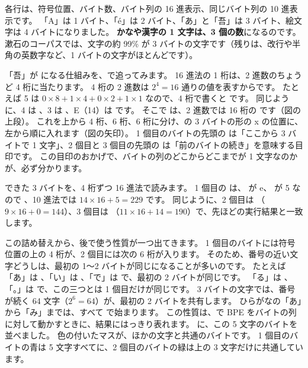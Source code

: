 
各行は、符号位置、バイト数、バイト列の 16 進表示、同じバイト列の 10 進表示です。
「A」は 1 バイト、「é」は 2 バイト、「あ」と「吾」は 3 バイト、絵文字は 4 バイトになりました。
\textbf{かなや漢字の 1 文字は、3 個の数}になるのです。
漱石のコーパスでは、文字の約 99\% が 3 バイトの文字です（残りは、改行や半角の英数字など、1 バイトの文字がほとんどです）。

「吾」が  になる仕組みを、で追ってみます。
16 進法の 1 桁は、2 進数のちょうど 4 桁に当たります。
4 桁の 2 進数は $2^4=16$ 通りの値を表すからです。
たとえば 5 は $0\times8+1\times4+0\times2+1\times1$ なので、4 桁で書くと  です。
同じように、4 は 、3 は 、E（14）は  です。
そこで  は、2 進数では 16 桁の  です（図の上段）。
これを上から 4 桁、6 桁、6 桁に分け、の 3 バイトの形の x の位置に、左から順に入れます（図の矢印）。
1 個目のバイトの先頭の  は「ここから 3 バイトで 1 文字」、2 個目と 3 個目の先頭の  は「前のバイトの続き」を意味する目印です。
この目印のおかげで、バイトの列のどこからどこまでが 1 文字なのかが、必ず分かります。

できた 3 バイトを、4 桁ずつ 16 進法で読みます。
1 個目の  は、 が e、 が 5 なので 、10 進法では $14\times16+5=229$ です。
同じように、2 個目は （$9\times16+0=144$）、3 個目は （$11\times16+14=190$）で、先ほどの実行結果と一致します。

この詰め替えから、後で使う性質が一つ出てきます。
1 個目のバイトには符号位置の上の 4 桁が、2 個目には次の 6 桁が入ります。
そのため、番号の近い文字どうしは、最初の 1〜2 バイトが同じになることが多いのです。
たとえば「あ」は 、「い」は 、「で」は  で、最初の 2 バイトが同じです。
「る」は 、「。」は  で、この三つとは 1 個目だけが同じです。
3 バイトの文字では、番号が続く 64 文字（$2^6=64$）が、最初の 2 バイトを共有します。
ひらがなの「あ」から「み」までは、すべて  で始まります。
この性質は、で BPE をバイトの列に対して動かすときに、結果にはっきり表れます。
に、この 5 文字のバイトを並べました。
色の付いたマスが、ほかの文字と共通のバイトです。
1 個目のバイトの青は 5 文字すべてに、2 個目のバイトの緑は上の 3 文字だけに共通しています。


